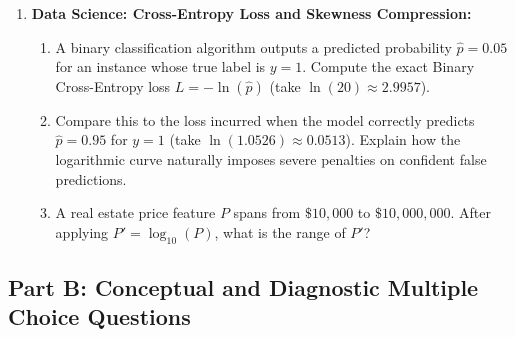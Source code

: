 \begin{enumerate}
    \item \textbf{Data Science: Cross-Entropy Loss and Skewness Compression:}
    \begin{enumerate}
        \item A binary classification algorithm outputs a predicted probability $\hat{p} = 0.05$ for an instance whose true label is $y = 1$. Compute the exact Binary Cross-Entropy loss $L = -\ln(\hat{p})$ (take $\ln(20) \approx 2.9957$).
        \item Compare this to the loss incurred when the model correctly predicts $\hat{p} = 0.95$ for $y = 1$ (take $\ln(1.0526) \approx 0.0513$). Explain how the logarithmic curve naturally imposes severe penalties on confident false predictions.
        \item A real estate price feature $P$ spans from $\$10{,}000$ to $\$10{,}000{,}000$. After applying $P' = \log_{10}(P)$, what is the range of $P'$?
    \end{enumerate}
\end{enumerate}

\subsection*{Part B: Conceptual and Diagnostic Multiple Choice Questions}

